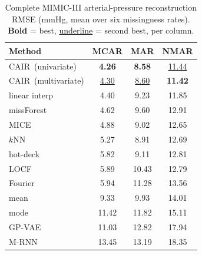 \begin{table}[t]
  \centering
  {\small
  \setlength{\tabcolsep}{6pt}
  \begin{tabular}{lccc}
    \toprule
    Method & MCAR & MAR & NMAR \\
    \midrule
    CAIR\ (univariate)   & \textbf{4.26} & \textbf{8.58} & \underline{11.44} \\
    CAIR\ (multivariate) & \underline{4.30} & \underline{8.60} & \textbf{11.42} \\
    linear interp   & 4.40 & 9.23 & 11.85 \\
    missForest      & 4.62 & 9.60 & 12.91 \\
    MICE            & 4.88 & 9.02 & 12.65 \\
    $k$NN           & 5.27 & 8.91 & 12.69 \\
    hot-deck        & 5.82 & 9.11 & 12.81 \\
    LOCF            & 5.89 & 10.43 & 12.79 \\
    Fourier         & 5.94 & 11.28 & 13.56 \\
    mean            & 9.33 & 9.93 & 14.01 \\
    mode            & 11.42 & 11.82 & 15.11 \\
    GP-VAE          & 11.03 & 12.82 & 17.94 \\
    M-RNN           & 13.45 & 13.19 & 18.35 \\
    \bottomrule
  \end{tabular}}
  \caption{Complete MIMIC-III arterial-pressure reconstruction RMSE (mmHg, mean
  over six missingness rates). \textbf{Bold} = best, \underline{underline} = second best, per column.}
  \label{tab:mimic-full}
\end{table}

